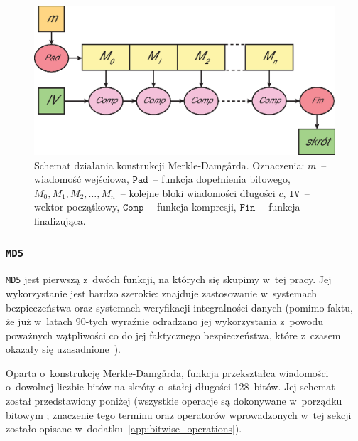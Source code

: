 \begin{figure}[H]
    \includegraphics[width=12cm]{img/merkle_damgard.eps}
    \caption{Schemat działania konstrukcji Merkle-Damg\r{a}rda. Oznaczenia:
    $m$~-- wiadomość wejściowa, $\mathtt{Pad}$~-- funkcja dopełnienia bitowego,
    $M_0, M_1, M_2, \ldots, M_n$~-- kolejne bloki wiadomości długości $c$,
    $\mathtt{IV}$~-- wektor początkowy, $\mathtt{Comp}$~-- funkcja kompresji,
    $\mathtt{Fin}$~-- funkcja finalizująca.}
    \label{fig:merkle_damgard}
\end{figure}



\subsubsection{\texttt{MD5}}
\texttt{MD5} jest pierwszą z~dwóch funkcji, na których się skupimy w~tej pracy.
Jej wykorzystanie jest bardzo szerokie: znajduje zastosowanie w~systemach
bezpieczeństwa oraz systemach weryfikacji integralności danych (pomimo faktu,
że już w~latach 90-tych wyraźnie odradzano jej wykorzystania z~powodu
poważnych wątpliwości co do jej faktycznego bezpieczeństwa, które z~czasem
okazały się uzasadnione~\cite{ps3_attack}).

Oparta o~konstrukcję Merkle-Damg\r{a}rda, funkcja przekształca wiadomości
o~dowolnej liczbie bitów na skróty o~stałej długości 128~bitów. Jej
schemat~\cite{md5_definition} został przedstawiony poniżej (wszystkie operacje
są dokonywane w~porządku bitowym ; znaczenie tego terminu
oraz operatorów wprowadzonych w~tej sekcji zostało opisane
w~dodatku~\ref{app:bitwise_operations}).

